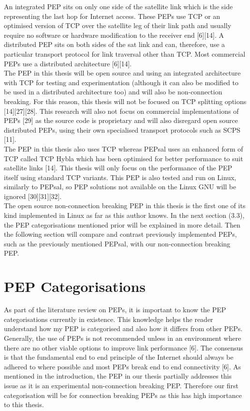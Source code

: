 \documentclass{uathesis}
\begin{document}
An integrated PEP sits on only one side of the satellite link which is the side representing the last hop for Internet access. These PEPs use TCP or an optimised version of TCP over the satellite leg of their link path and usually require no software or hardware modification to the receiver end [6][14]. A distributed PEP sits on both sides of the sat link and can, therefore, use a particular transport protocol for link traversal other than TCP. Most commercial PEPs use a distributed architecture [6][14]. \\

The PEP in this thesis will be open source and using an integrated architecture with TCP for testing and experimentation (although it can also be modified to be used in a distributed architecture too) and will also be non-connection breaking. For this reason, this thesis will not be focused on TCP splitting options [14][27][28]. This research will also not focus on commercial implementations of PEPs [29] as the source code is proprietary and will also disregard open source distributed PEPs, using their own specialised transport protocols such as SCPS [11]. \\

The PEP in this thesis also uses TCP whereas PEPsal uses an enhanced form of TCP called TCP Hybla which has been optimised for better performance to suit satellite links [14]. This thesis will only focus on the performance of the PEP itself using standard TCP variants. This PEP is also tested and run on Linux, similarly to PEPsal, so PEP solutions not available on the Linux GNU will be ignored [30][31][32]. \\

The open source non-connection breaking PEP in this thesis is the first one of its kind implemented in Linux as far as this author knows. In the next section (3.3), the PEP categorisations mentioned prior will be explained in more detail. Then the following section will compare and contrast previously implemented PEPs, such as the previously mentioned PEPsal, with our non-connection breaking PEP. \\

\section{PEP Categorisations}
As part of the literature review on PEPs, it is important to know the PEP categorisations currently in existence. This knowledge helps the reader understand how my PEP is categorised and also how it differs from other PEPs. Generally, the use of PEPs is not recommended unless in an environment where there are no other viable options to improve link performance [6]. The consensus is that the fundamental end to end principle of the Internet should always be adhered to where possible and most PEPs break end to end connectivity [6]. As mentioned in the introduction, the PEP in our thesis partially addresses this issue as it is an experimental non-connection breaking PEP. Therefore our first categorisation will be for connection breaking PEPs as this has high importance to this thesis. 
\end{document}
